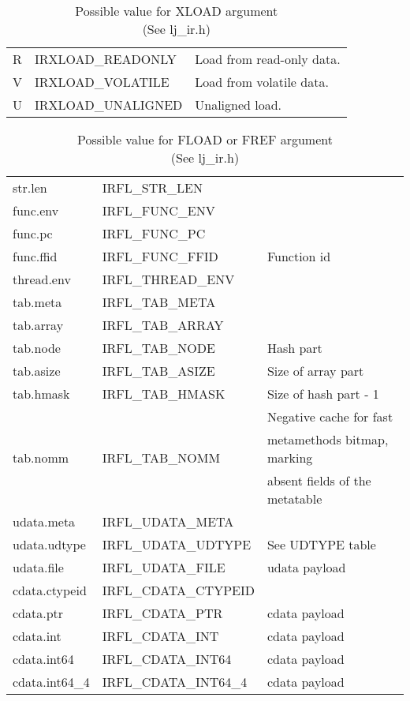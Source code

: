 \begin{table}
\centering
\begin{tabular}{|l|l|l|}
\hline
R & IRXLOAD\_READONLY  & Load from read-only data.\\
V & IRXLOAD\_VOLATILE  & Load from volatile data.\\
U & IRXLOAD\_UNALIGNED & Unaligned load.\\
\hline
\end{tabular}
\caption{
  Possible value for XLOAD argument \\(See lj\_ir.h)
}
\label{tab:dump-xload}
\end{table}
\begin{table}
\centering
\begin{tabular}{|l|l|l|}
\hline
str.len        & IRFL\_STR\_LEN        & \\
func.env       & IRFL\_FUNC\_ENV       & \\
func.pc        & IRFL\_FUNC\_PC        & \\
func.ffid      & IRFL\_FUNC\_FFID      & Function id\\
thread.env     & IRFL\_THREAD\_ENV     & \\
tab.meta       & IRFL\_TAB\_META       & \\
tab.array      & IRFL\_TAB\_ARRAY      & \\
tab.node       & IRFL\_TAB\_NODE       & Hash part\\
tab.asize      & IRFL\_TAB\_ASIZE      & Size of array part\\
tab.hmask      & IRFL\_TAB\_HMASK      & Size of hash part - 1\\\hline
\multirow{3}{*}{tab.nomm} & \multirow{3}{*}{IRFL\_TAB\_NOMM} & Negative cache for fast \\
& & metamethods bitmap, marking\\
& & absent fields of the metatable\\\hline
udata.meta     & IRFL\_UDATA\_META     & \\
udata.udtype   & IRFL\_UDATA\_UDTYPE   & See UDTYPE table\\
udata.file     & IRFL\_UDATA\_FILE     & udata payload \\
cdata.ctypeid  & IRFL\_CDATA\_CTYPEID  & \\
cdata.ptr      & IRFL\_CDATA\_PTR      & cdata payload \\
cdata.int      & IRFL\_CDATA\_INT      & cdata payload \\
cdata.int64    & IRFL\_CDATA\_INT64    & cdata payload \\
cdata.int64\_4 & IRFL\_CDATA\_INT64\_4 & cdata payload \\
\hline
\end{tabular}
\caption{
  Possible value for FLOAD or FREF argument \\(See lj\_ir.h)
}
\label{tab:dump-fload-fref}
\end{table}
